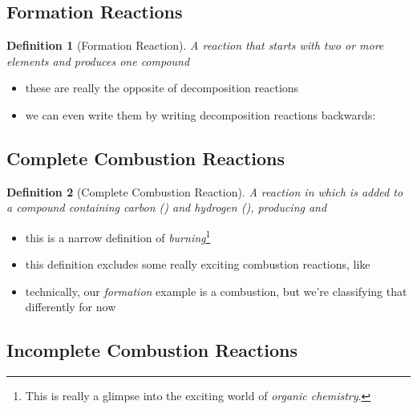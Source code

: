 \documentclass[11pt, oneside]{article}   	%
\newtheorem{definition}{Definition}
\begin{document}
\subsection{Formation Reactions}

\begin{definition}[Formation Reaction]\label{defn:reaction:formation}
A reaction that starts with two or more elements and produces one compound
\end{definition}
\begin{itemize}
\item these are really the opposite of decomposition reactions
\item we can even write them by writing decomposition reactions backwards:\\ 
\end{itemize}


\subsection{Complete Combustion Reactions}

\begin{definition}[Complete Combustion Reaction]\label{defn:reaction:complete-combustion}
A reaction in which  is added to a compound containing carbon () and hydrogen (), producing  and 
\end{definition}
\begin{itemize}
\item this is a narrow definition of \emph{burning}\footnote{This is really a glimpse into the exciting world of \emph{organic chemistry}.}
\item this definition excludes some really exciting combustion reactions, like\\
\item technically, our \emph{formation} example is a combustion, but we're classifying that differently for now
\end{itemize}


\subsection{Incomplete Combustion Reactions}
\end{document}
